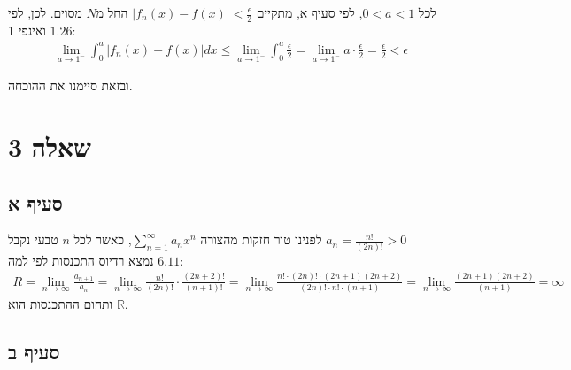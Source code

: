 \documentclass{article}
\def\reals{\mathbb{R}}
\begin{document}
            לכל $0<a<1$, לפי סעיף א, מתקיים $|f_n(x)-f(x)|<\frac{\epsilon}{2}$ החל מ$N$ מסוים.
            לכן, לפי $1.26$ ואינפי 1:
            \begin{align*}
                \lim_{a\rightarrow 1^-} \int_0^a |f_n(x)-f(x)|dx \leq
                \lim_{a\rightarrow 1^-} \int_0^a \frac{\epsilon}{2} =
                \lim_{a\rightarrow 1^-} a \cdot \frac{\epsilon}{2} = \frac{\epsilon}{2} < \epsilon
            \end{align*}

            ובזאת סיימנו את ההוכחה.

            \pagebreak

            \section*{שאלה 3}

            \subsection*{סעיף א}

            לפנינו טור חזקות מהצורה $\sum_{n=1}^\infty a_nx^n$, כאשר לכל $n$ טבעי נקבל $a_n=\frac{n!}{(2n)!}>0$ \\
            נמצא רדיוס התכנסות לפי למה $6.11$:
            \begin{align*}
                R=\lim_{n\rightarrow\infty} \frac{a_{n+1}}{a_n} =
                \lim_{n\rightarrow\infty} \frac{n!}{(2n)!} \cdot \frac{(2n+2)!}{(n+1)!} =
                \lim_{n\rightarrow\infty} \frac{n!\cdot (2n)! \cdot  (2n+1) (2n+2)}{(2n)! \cdot n!\cdot  (n+1)} =
                \lim_{n\rightarrow\infty} \frac{(2n+1) (2n+2)}{(n+1)} = \infty
            \end{align*}
            ותחום ההתכנסות הוא $\reals$.

            \subsection*{סעיף ב}
\end{document}
